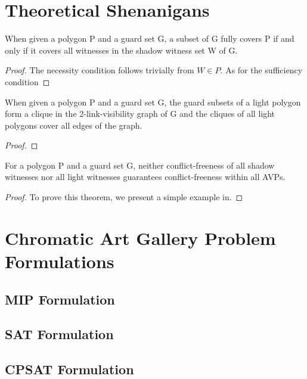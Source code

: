 \chapter{Theoretical Shenanigans}

\begin{theorem}
When given a polygon P and a guard set G, a subset of G fully covers P if and only if it covers all witnesses in the shadow witness set W of G.
\end{theorem}
\begin{proof}
The necessity condition follows trivially from $W\in P$. As for the sufficiency condition 
\end{proof}

\begin{theorem}
When given a polygon P and a guard set G, the guard subsets of a light polygon form a clique in the 2-link-visibility graph of G and the cliques of all light polygons cover all edges of the graph.
\end{theorem}
\begin{proof}
    
\end{proof}

\begin{theorem}
For a polygon P and a guard set G, neither conflict-freeness of all shadow witnesses nor all light witnesses guarantees conflict-freeness within all AVPs.
\end{theorem}
\begin{proof}
To prove this theorem, we present a simple example in.
\end{proof}

\chapter{Chromatic Art Gallery Problem Formulations}

\section{MIP Formulation}

\section{SAT Formulation}

\section{CPSAT Formulation}

